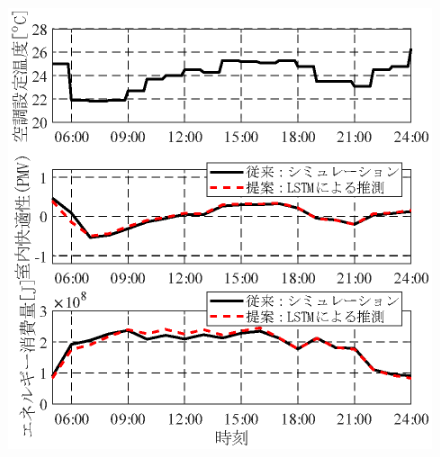 \begin{figure}[htbp]
  \begin{center}
    \begin{minipage}{0.45\textwidth}
      \begin{center}
        \includegraphics[width=1\textwidth,keepaspectratio=true]{fig/surrogate_result_schedule_a.eps}\\\vspace{-5mm}{\small スケジュールA (最も快適な解)}
      \end{center}
    \end{minipage}
    \\
    \begin{minipage}{0.45\textwidth}
      \begin{center}

\end{center}
\end{minipage}
\end{center}
\end{figure}
